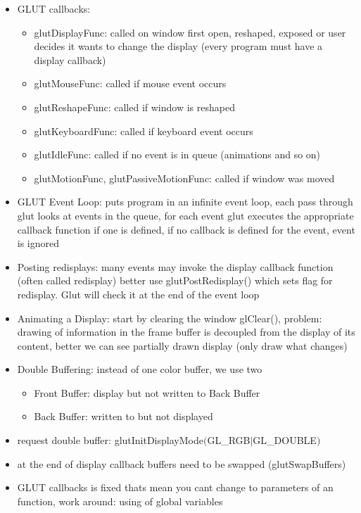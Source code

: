 \documentclass[11pt,a4paper]{article}
\begin{document}
\begin{itemize}
		\item GLUT callbacks:
		\begin{itemize}
			\item glutDisplayFunc: called on window first open, reshaped, exposed or user decides it wants to change the display (every program must have a display callback)
			\item glutMouseFunc: called if mouse event occurs
			\item glutReshapeFunc: called if window is reshaped
			\item glutKeyboardFunc: called if keyboard event occurs
			\item glutIdleFunc: called if no event is in queue (animations and so on)
			\item glutMotionFunc, glutPassiveMotionFunc: called if window was moved
		\end{itemize}
		\item GLUT Event Loop: puts program in an infinite event loop, each pass through glut looks at events in the queue, for each event glut executes the appropriate callback function if one is defined, if no callback is defined for the event, event is ignored
		\item Posting redisplays: many events may invoke the display callback function (often called redisplay) better use glutPostRedisplay() which sets flag for redisplay. Glut will check it at the end of the event loop
		\item Animating a Display: start by clearing the window glClear(), problem: drawing of information in the frame buffer is decoupled from the display of its content, better we can see partially drawn display (only draw what changes)
		\item Double Buffering: instead of one color buffer, we use two
		\begin{itemize}
			\item Front Buffer: display but not written to Back Buffer
			\item Back Buffer: written to but not displayed
		\end{itemize}
		\item request double buffer: glutInitDisplayMode$($GL\_RGB$|$GL\_DOUBLE$)$
		\item at the end of display callback buffers need to be swapped (glutSwapBuffers)
		\item GLUT callbacks is fixed thats mean you cant change to parameters of an function, work around: using of global variables 
	\end{itemize}
	
\end{document}
